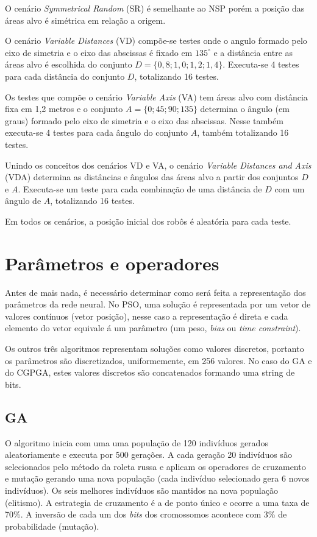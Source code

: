 O cenário \textit{Symmetrical Random} (SR) é semelhante ao NSP porém a posição das áreas alvo é simétrica em relação a origem.

O cenário \textit{Variable Distances} (VD) compõe-se testes onde o angulo formado pelo eixo de simetria e o eixo das abscissas é fixado em $135^{\circ}$ e a distância entre as áreas alvo é escolhida do conjunto $D = \{0,8; 1,0; 1,2; 1,4\}$. Executa-se 4 testes para cada distância do conjunto $D$, totalizando 16 testes.


Os testes que compõe o cenário \textit{Variable Axis} (VA) tem áreas alvo com distância fixa em 1,2 metros e o conjunto $A = \{0; 45; 90; 135\}$ determina o ângulo (em graus) formado pelo eixo de simetria e o eixo das abscissas. Nesse também executa-se 4 testes para cada ângulo do conjunto $A$, também totalizando 16 testes.

Unindo os conceitos dos cenários VD e VA, o cenário \textit{Variable Distances and Axis} (VDA) determina as distâncias e ângulos das áreas alvo a partir dos conjuntos $D$ e $A$. Executa-se um teste para cada combinação de uma distância de $D$ com um ângulo de $A$, totalizando 16 testes.

Em todos os cenários, a posição inicial dos robôs é aleatória para cada teste.

\section{Parâmetros e operadores}

Antes de mais nada, é necessário determinar como será feita a representação dos parâmetros da rede neural. No PSO, uma solução é representada por um vetor de valores contínuos (vetor posição), nesse caso a representação é direta e cada elemento do vetor equivale á um parâmetro (um peso, \textit{bias} ou \textit{time constraint}).

Os outros três algoritmos representam soluções como valores discretos, portanto os parâmetros são discretizados, uniformemente, em 256 valores. No caso do GA e do CGPGA, estes valores discretos são concatenados formando uma string de bits.

\subsection{GA}

O algoritmo inicia com uma uma população de 120 indivíduos gerados aleatoriamente e executa por 500 gerações. A cada geração 20 indivíduos são selecionados pelo método da roleta russa e aplicam os operadores de cruzamento e mutação gerando uma nova população (cada indivíduo selecionado gera 6 novos indivíduos). Os seis melhores indivíduos são mantidos na nova população (elitismo). A estrategia de cruzamento é a de ponto único e ocorre a uma taxa de 70\%. A inversão de cada um dos \textit{bits} dos cromossomos acontece com 3\% de probabilidade (mutação).

